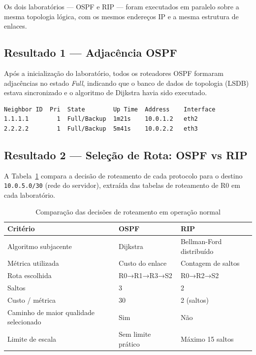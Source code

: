 \documentclass[12pt]{article}
\begin{document}
Os dois laboratórios — OSPF e RIP — foram executados em paralelo sobre a mesma
topologia lógica, com os mesmos endereços IP e a mesma estrutura de enlaces.

\subsection{Resultado 1 — Adjacência OSPF}

Após a inicialização do laboratório, todos os roteadores OSPF formaram adjacências
no estado \textit{Full}, indicando que o banco de dados de topologia (LSDB) estava
sincronizado e o algoritmo de Dijkstra havia sido executado.

\begin{verbatim}
Neighbor ID  Pri  State        Up Time  Address    Interface
1.1.1.1        1  Full/Backup  1m21s    10.0.1.2   eth2
2.2.2.2        1  Full/Backup  5m41s    10.0.2.2   eth3
\end{verbatim}

\subsection{Resultado 2 — Seleção de Rota: OSPF vs RIP}

A Tabela~\ref{tab:comparacao} compara a decisão de roteamento de cada protocolo
para o destino \texttt{10.0.5.0/30} (rede do servidor), extraída das tabelas de
roteamento de R0 em cada laboratório.

\begin{table}[h]
\centering
\caption{Comparação das decisões de roteamento em operação normal}
\label{tab:comparacao}
\begin{tabular}{@{}lll@{}}
\toprule
\textbf{Critério} & \textbf{OSPF} & \textbf{RIP} \\
\midrule
Algoritmo subjacente    & Dijkstra              & Bellman-Ford distribuído \\
Métrica utilizada       & Custo do enlace       & Contagem de saltos \\
Rota escolhida          & R0→R1→R3→S2           & R0→R2→S2 \\
Saltos                  & 3                     & 2 \\
Custo / métrica         & 30                    & 2 (saltos) \\
Caminho de maior qualidade selecionado & Sim   & Não \\
Limite de escala        & Sem limite prático    & Máximo 15 saltos \\
\bottomrule
\end{tabular}
\end{table}
\end{document}
